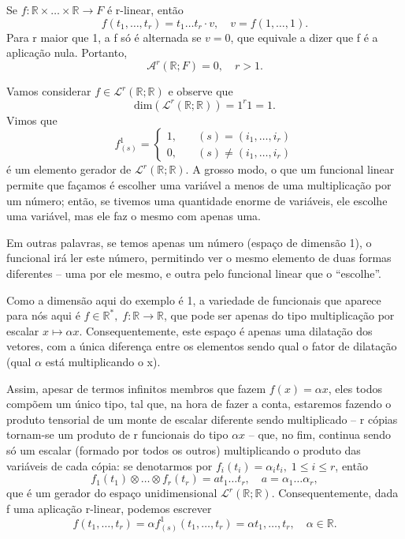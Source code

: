 \documentclass[../differential_forms.tex]{subfiles}
\begin{document}
\begin{example}
	Se \(f:\mathbb{R}\times \dotsc \times \mathbb{R}\rightarrow F\) é r-linear, então
	\[
		f(t_1,\dotsc , t_r)=t_1 \dotsc t_r \cdot v,\quad v=f(1,\dotsc ,1).
	\]
	Para r maior que 1, a f só é alternada se \(v=0\), que equivale a dizer que f é a aplicação nula. Portanto,
	\[
		\mathcal{A}^{r}(\mathbb{R}; F)=0,\quad r>1.
	\]
\end{example}
\begin{example}
	Vamos considerar \(f\in \mathcal{L}^{r}(\mathbb{R}; \mathbb{R})\) e observe que
	\[
		\mathrm{dim}(\mathcal{L}^{r}(\mathbb{R}; \mathbb{R})) = 1^{r}1 = 1.
	\]
	Vimos que
	\[
		f_{(s)}^{1} = \left\{\begin{array}{ll}
			1, & \quad (s) = (i_1,\dotsc , i_r)    \\
			0, & \quad (s) \neq (i_1,\dotsc , i_r)
		\end{array}\right.
	\]
	é um elemento gerador de \(\mathcal{L}^{r}(\mathbb{R}; \mathbb{R})\). A grosso modo, o que um funcional linear permite que façamos é
	escolher uma variável a menos de uma multiplicação por um número; então, se tivemos uma quantidade enorme de variáveis, ele escolhe
	uma variável, mas ele faz o mesmo com apenas uma.

	Em outras palavras, se temos apenas um número (espaço de dimensão 1), o funcional irá ler este número, permitindo ver o mesmo elemento
	de duas formas diferentes -- uma por ele mesmo, e outra pelo funcional linear que o ``escolhe''.

	Como a dimensão aqui do exemplo é 1, a variedade de funcionais que aparece para nós aqui é \(f\in \mathbb{R}^{*},\; f:\mathbb{R}\rightarrow \mathbb{R}\), que pode
	ser apenas do tipo multiplicação por escalar \(x\mapsto \alpha x\). Consequentemente, este espaço é apenas uma dilatação dos vetores, com
	a única diferença entre os elementos sendo qual o fator de dilatação (qual \(\alpha \) está multiplicando o x).

	Assim, apesar de termos	infinitos membros que fazem \(f(x) = \alpha x\), eles todos compõem um único tipo, tal que, na hora de fazer a conta,
	estaremos fazendo o produto tensorial de um monte de escalar diferente sendo multiplicado -- r cópias tornam-se um produto
	de r funcionais do tipo \(\alpha x\) -- que, no fim, continua sendo só um escalar (formado por todos os outros) multiplicando o produto
	das variáveis de cada cópia: se denotarmos por \(f_{i}(t_{i}) = \alpha_{i}t_{i},\; 1\leq i\leq r\), então
	\[
		f_1(t_1)\otimes \dotsc \otimes f_r(t_r) = at_1 \dotsc t_r, \quad a =\alpha_1 \dotsc \alpha_r,
	\]
	que é um gerador do espaço unidimensional \(\mathcal{L}^{r}(\mathbb{R}; \mathbb{R})\). Consequentemente, dada f uma aplicação r-linear, podemos escrever
	\[
		f(t_1, \dotsc , t_r) = \alpha f_{(s)}^{1}(t_1, \dotsc , t_r) = \alpha t_1, \dotsc , t_r, \quad \alpha \in \mathbb{R}.
	\]
\end{example}
\end{document}
